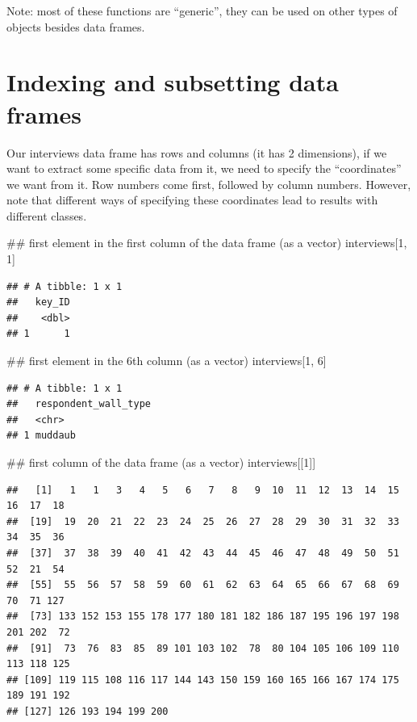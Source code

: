 \documentclass[]{book}
\newenvironment{Shaded}{\begin{snugshade}}{\end{snugshade}}
\newcommand{\DecValTok}[1]{\textcolor[rgb]{0.00,0.00,0.81}{#1}}
\newcommand{\NormalTok}[1]{#1}
\begin{document}
Note: most of these functions are ``generic'', they can be used on other
types of objects besides data frames.

\section{Indexing and subsetting data
frames}\label{indexing-and-subsetting-data-frames}

Our interviews data frame has rows and columns (it has 2 dimensions), if
we want to extract some specific data from it, we need to specify the
``coordinates'' we want from it. Row numbers come first, followed by
column numbers. However, note that different ways of specifying these
coordinates lead to results with different classes.

\begin{Shaded}
\begin{Highlighting}[]
\NormalTok{## first element in the first column of the data frame (as a vector)}
\NormalTok{interviews[}\DecValTok{1}\NormalTok{, }\DecValTok{1}\NormalTok{]}
\end{Highlighting}
\end{Shaded}

\begin{verbatim}
## # A tibble: 1 x 1
##   key_ID
##    <dbl>
## 1      1
\end{verbatim}

\begin{Shaded}
\begin{Highlighting}[]
\NormalTok{## first element in the 6th column (as a vector)}
\NormalTok{interviews[}\DecValTok{1}\NormalTok{, }\DecValTok{6}\NormalTok{]}
\end{Highlighting}
\end{Shaded}

\begin{verbatim}
## # A tibble: 1 x 1
##   respondent_wall_type
##   <chr>               
## 1 muddaub
\end{verbatim}

\begin{Shaded}
\begin{Highlighting}[]
\NormalTok{## first column of the data frame (as a vector)}
\NormalTok{interviews[[}\DecValTok{1}\NormalTok{]]}
\end{Highlighting}
\end{Shaded}

\begin{verbatim}
##   [1]   1   1   3   4   5   6   7   8   9  10  11  12  13  14  15  16  17  18
##  [19]  19  20  21  22  23  24  25  26  27  28  29  30  31  32  33  34  35  36
##  [37]  37  38  39  40  41  42  43  44  45  46  47  48  49  50  51  52  21  54
##  [55]  55  56  57  58  59  60  61  62  63  64  65  66  67  68  69  70  71 127
##  [73] 133 152 153 155 178 177 180 181 182 186 187 195 196 197 198 201 202  72
##  [91]  73  76  83  85  89 101 103 102  78  80 104 105 106 109 110 113 118 125
## [109] 119 115 108 116 117 144 143 150 159 160 165 166 167 174 175 189 191 192
## [127] 126 193 194 199 200
\end{verbatim}
\end{document}

